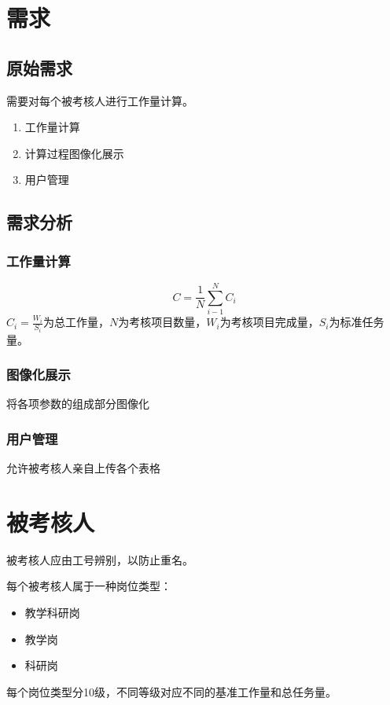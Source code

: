\documentclass[UTF8,fontset=windowsnew]{ctexart}
\begin{document}
\songti

\section{需求}
\subsection{原始需求}
需要对每个被考核人进行工作量计算。
\begin{enumerate}
    \item 工作量计算
    \item 计算过程图像化展示
    \item 用户管理
\end{enumerate}
\subsection{需求分析}
\subsubsection{工作量计算}
\begin{equation}
  C=\frac{1}{N}\sum_{i-1}^NC_i\label{eq:main}
\end{equation}
$C_i=\frac{W_i}{S_i}$为总工作量，$N$为考核项目数量，$W_i$为考核项目完成量，$S_i$为标准任务量。\par
\subsubsection{图像化展示}
将各项参数的组成部分图像化
\subsubsection{用户管理}
允许被考核人亲自上传各个表格
\section{被考核人}
被考核人应由工号辨别，以防止重名。\par
每个被考核人属于一种岗位类型：\par
\begin{itemize}
  \item 教学科研岗
  \item 教学岗
  \item 科研岗
\end{itemize}
每个岗位类型分10级，不同等级对应不同的基准工作量和总任务量。
\end{document}
